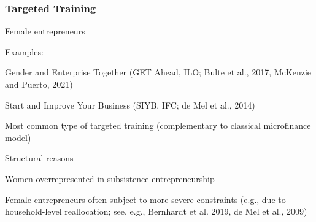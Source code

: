 \documentclass[hideothersubsections, usenames,dvipsnames,11pt]{beamer}
\newenvironment{itemize_2pt}{\itemize\addtolength{\itemsep}{2pt}}{\enditemize}
\begin{document}
\begin{frame}
\frametitle{Targeted Training}
	Female entrepreneurs
	\begin{itemize_2pt}
		\item Examples: 
		\begin{itemize_2pt}
			\item Gender and Enterprise Together (GET Ahead, ILO; \textcolor{camel}{Bulte et al., 2017}, \textcolor{camel}{McKenzie and Puerto, 2021})
			\item Start and Improve Your Business (SIYB, IFC; \textcolor{camel}{de Mel et al., 2014})
		\end{itemize_2pt}
		\item \textcolor{bdf}{Most common type of targeted training} (complementary to classical microfinance model)
		
		\vspace{0.5em}
		
		\item Structural reasons
		\begin{itemize_2pt}
			\item Women overrepresented in subsistence entrepreneurship
			\item Female entrepreneurs often subject to more severe constraints (e.g., due to household-level reallocation; see, e.g., \textcolor{camel}{Bernhardt et al. 2019}, \textcolor{camel}{de Mel et al., 2009})
		\end{itemize_2pt}
	\end{itemize_2pt}
\end{frame}
\end{document}
